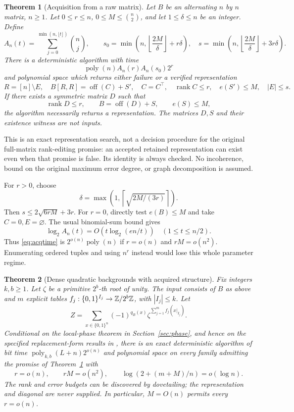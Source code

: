\documentclass[11pt,a4paper]{article}
\newtheorem{theorem}{Theorem}[section]
\theoremstyle{remark}\newtheorem{remark}[theorem]{Remark}
\newcommand{\bits}{\{0,1\}}\newcommand{\poly}{\operatorname{poly}}
\newcommand{\rank}{\operatorname{rank}}\newcommand{\diag}{\operatorname{diag}}
\newcommand{\off}{\operatorname{off}}\newcommand{\col}{\operatorname{col}}
\begin{document}
\begin{theorem}[Acquisition from a raw matrix]\label{thm:acquire}
Let $B$ be an alternating $n$ by $n$ matrix, $n\ge1$. Let $0\le r\le n$,
$0\le M\le\binom n2$, and let $1\le\delta\le n$ be an integer. Define
\[
A_n(t)=\sum_{j=0}^{\min(n,\lfloor t\rfloor)}\binom nj,\qquad
s_0=\min\!\left(n,\left\lfloor\frac{2M}{\delta}\right\rfloor+r\delta\right),
\quad
s=\min\!\left(n,\left\lfloor\frac{2M}{\delta}\right\rfloor+3r\delta\right).
\]
There is a deterministic algorithm with time
\begin{equation}\label{eq:acqtime}
\poly(n) A_n(r)A_n(s_0)2^r
\end{equation}
and polynomial space which returns either failure or a verified
representation
\[
R=[n]\setminus E,\quad
B[R,R]=\off(C)+S',\quad
C=C^\top,\quad \rank C\le r,\quad e(S')\le M,\quad |E|\le s.
\]
If there exists a symmetric matrix $D$ such that
\[
\rank D\le r,\qquad B=\off(D)+S,\qquad e(S)\le M,
\]
the algorithm necessarily returns a representation. The matrices
$D,S$ and their existence witness are not inputs.
\end{theorem}

This is an exact representation search, not a decision procedure
for the original full-matrix rank-editing promise: an accepted
retained representation can exist even when that promise is false.
Its identity is always checked. No incoherence, bound on the original
maximum error degree, or graph decomposition is assumed.

For $r>0$, choose
\begin{equation}\label{eq:radius}
\delta=\max\left(1,\left\lceil\sqrt{2M/(3r)}\right\rceil\right).
\end{equation}
Then $s\le 2\sqrt{6rM}+3r$. For $r=0$, directly test $e(B)\le M$
and take $C=0,E=\varnothing$. The usual binomial-sum bound gives
\[
\log_2 A_n(t)=O\!\left(t\log_2(en/t)\right)\quad(1\le t\le n/2).
\]
Thus \eqref{eq:acqtime} is $2^{o(n)}\poly(n)$ if
$r=o(n)$ and $rM=o(n^2)$. Enumerating ordered tuples and
using $n^r$ instead would lose this whole parameter regime.

\begin{theorem}[Dense quadratic backgrounds with acquired structure]
\label{thm:count}
Fix integers $k,b\ge1$. Let $\zeta$ be a primitive $2^b$-th root of
unity. The input consists of $B$ as above and $m$ explicit
tables $f_j:\bits^{I_j}\to\Z/2^b\Z$, with $|I_j|\le k$. Let
\[
Z=\sum_{x\in\bits^n}(-1)^{q_B(x)}
       \zeta^{\sum_{j=1}^m f_j(x|_{I_j})}.
\]
Conditional on the local-phase theorem in Section~\ref{sec:phase},
and hence on the specified replacement-form results in
\cite{governing}, there is an exact deterministic algorithm of bit
time $\poly_{k,b}(L+n)2^{o(n)}$ and polynomial space on every family
admitting the promise of Theorem~\ref{thm:acquire} with
\begin{equation}\label{eq:favorable}
r=o(n),\qquad rM=o(n^2),\qquad
\log(2+(m+M)/n)=o(\log n).
\end{equation}
The rank and error budgets can be discovered by dovetailing; the
representation and diagonal are never supplied. In particular,
$M=O(n)$ permits every $r=o(n)$.
\end{theorem}
\end{document}
